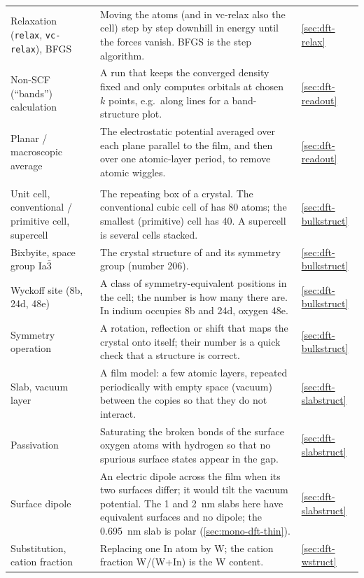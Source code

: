 \begin{small}
\begin{longtable}{@{}>{\raggedright\arraybackslash}p{3.3cm}>{\raggedright\arraybackslash}p{9.0cm}>{\raggedright\arraybackslash}p{1.6cm}@{}}
Relaxation (\texttt{relax}, \texttt{vc-relax}), BFGS & Moving the atoms (and in vc-relax also the cell) step by step
downhill in energy until the forces vanish. BFGS is the step algorithm. & \ref{sec:dft-relax} \\
Non-SCF (``bands'') calculation & A run that keeps the converged density fixed and only computes orbitals at
chosen $k$ points, e.g.\ along lines for a band-structure plot. & \ref{sec:dft-readout} \\
Planar / macroscopic average & The electrostatic potential averaged over each plane parallel to the film, and then
over one atomic-layer period, to remove atomic wiggles. & \ref{sec:dft-readout} \\
\midrule
\multicolumn{3}{@{}l}{\textit{Describing the material}}\\
Unit cell, conventional / primitive cell, supercell & The repeating box of a crystal. The conventional cubic cell of
\InO{} has 80 atoms; the smallest (primitive) cell has 40. A supercell is several cells stacked. & \ref{sec:dft-bulkstruct} \\
Bixbyite, space group Ia$\bar{3}$ & The crystal structure of \InO{} and its symmetry group (number 206). & \ref{sec:dft-bulkstruct} \\
Wyckoff site (8b, 24d, 48e) & A class of symmetry-equivalent positions in the cell; the number is how many there are.
In \InO{} indium occupies 8b and 24d, oxygen 48e. & \ref{sec:dft-bulkstruct} \\
Symmetry operation & A rotation, reflection or shift that maps the crystal onto itself; their number is a quick check
that a structure is correct. & \ref{sec:dft-bulkstruct} \\
Slab, vacuum layer & A film model: a few atomic layers, repeated periodically with empty space (vacuum) between the
copies so that they do not interact. & \ref{sec:dft-slabstruct} \\
Passivation & Saturating the broken bonds of the surface oxygen atoms with hydrogen so that no spurious surface states
appear in the gap. & \ref{sec:dft-slabstruct} \\
Surface dipole & An electric dipole across the film when its two surfaces differ; it would tilt the vacuum potential.
The 1 and 2~nm slabs here have equivalent surfaces and no dipole; the 0.695~nm slab is polar (\cref{sec:mono-dft-thin}). & \ref{sec:dft-slabstruct} \\
Substitution, cation fraction & Replacing one In atom by W; the cation fraction W/(W+In) is the W content. & \ref{sec:dft-wstruct} \\

\end{longtable}
\end{small}
